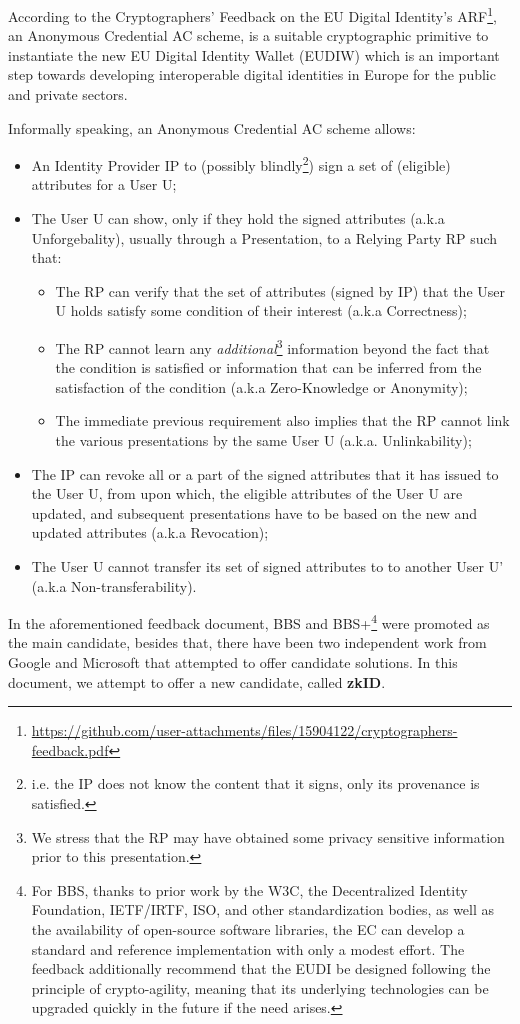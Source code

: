 According to the Cryptographers' Feedback on the EU Digital Identity’s ARF\footnote{\url{https://github.com/user-attachments/files/15904122/cryptographers-feedback.pdf}}, an Anonymous Credential AC scheme, is a suitable cryptographic primitive to instantiate the new EU Digital Identity Wallet (EUDIW) which is an important step towards developing interoperable digital identities in Europe for the public and private sectors.

Informally speaking, an Anonymous Credential AC scheme allows:
\begin{itemize}
	\item An Identity Provider IP to (possibly blindly\footnote{i.e. the IP does not know the content that it signs, only its provenance is satisfied.}) sign a set of (eligible) attributes for a User U;
	\item The User U can show, only if they hold the signed attributes (a.k.a Unforgebality), usually through a Presentation, to a Relying Party RP such that:
	\begin{itemize}
		\item The RP can verify that the set of attributes (signed by IP) that the User U holds satisfy some condition of their interest (a.k.a Correctness);
		\item The RP cannot learn any \emph{additional}\footnote{We stress that the RP may have obtained some privacy sensitive information prior to this presentation.} information beyond the fact that the condition is satisfied or information that can be inferred from the satisfaction of the condition (a.k.a Zero-Knowledge or Anonymity);
		\item The immediate previous requirement also implies that the RP cannot link the various presentations by the same User U (a.k.a. Unlinkability);
	\end{itemize}
	\item The IP can revoke all or a part of the signed attributes that it has issued to the User U, from upon which, the eligible attributes of the User U are updated, and subsequent presentations have to be based on the new and updated attributes (a.k.a Revocation);
	\item The User U cannot transfer its set of signed attributes to to another User U' (a.k.a Non-transferability).
\end{itemize}

In the aforementioned feedback document, BBS and BBS+\footnote{For BBS, thanks to prior work by the W3C, the Decentralized Identity Foundation, IETF/IRTF, ISO, and other standardization bodies, as well as the availability of open-source software libraries, the EC can develop a standard and reference implementation with only a modest effort. The feedback additionally recommend that the EUDI be designed following the principle of crypto-agility, meaning that its underlying technologies can be upgraded quickly in the future if the need arises.} were promoted as the main candidate, besides that, there have been two independent work from Google and Microsoft that attempted to offer candidate solutions. In this document, we attempt to offer a new candidate, called \textbf{zkID}.

